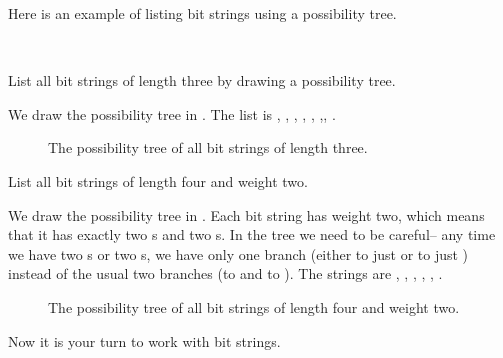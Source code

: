 Here is an example of listing bit strings using a possibility tree.  

\begin{exam}
\label{exam_bit_string_length3}
~
    \begin{apart}
        \item List all bit strings of length three by drawing a possibility tree.  
            \begin{soln}
              We draw the possibility tree in .  The list is , , , , , ,, .
        \end{soln}
        
        \begin{figure}[hbtp]
        \centering
        
        \caption{The possibility tree of all bit strings of length three.}
        \label{fig_tree_bit_strings_length3}
        \end{figure}

        \item List all bit strings of length four and weight two. 
            \begin{soln} 
                We draw the possibility tree in . Each bit string has weight two, which means that it has exactly two s and two s.  In the tree we need to be careful-- any time we have two s or two s, we have only one branch (either to just  or to just )  instead of the usual two branches (to  and to ).  The strings are , , , , , .
    \end{soln}
    
        \begin{figure}[hbtp]
        \centering
        \caption{The possibility tree of all bit strings of length four and weight two.}
        \label{fig_tree_bit_strings_length4_weight2}
        \end{figure}       
    \end{apart}   
\end{exam}

Now it is your turn to work with bit strings.

